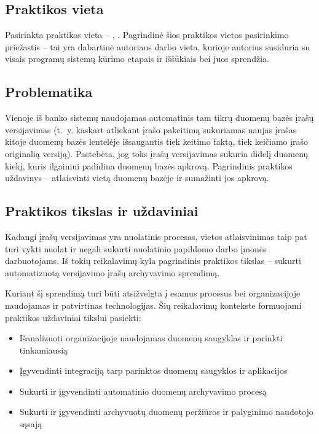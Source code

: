 
\subsection*{Praktikos vieta}
Pasirinkta praktikos vieta -- \SEB, \PDT. Pagrindinė šios praktikos vietos pasirinkimo priežastis -- tai yra dabartinė autoriaus darbo vieta, kurioje autorius susiduria su visais programų sistemų kūrimo etapais ir iššūkiais bei juos sprendžia. 

\subsection*{Problematika}
Vienoje iš banko sistemų naudojamas automatinis tam tikrų duomenų bazės įrašų versijavimas (t.~y. kaskart atliekant įrašo pakeitimą sukuriamas naujas įrašas kitoje duomenų bazės lentelėje išsaugantis tiek keitimo faktą, tiek keičiamo įrašo originalią versiją). Pastebėta, jog toks įrašų versijavimas sukuria didelį duomenų kiekį, kuris ilgainiui padidina duomenų bazės apkrovą. Pagrindinis praktikos uždavinys -- atlaisvinti vietą duomenų bazėje ir sumažinti jos apkrovą.

\subsection*{Praktikos tikslas ir uždaviniai}
Kadangi įrašų versijavimas yra nuolatinis procesas, vietos atlaisvinimas taip pat turi vykti nuolat ir negali sukurti nuolatinio papildomo darbo įmonės darbuotojams. Iš tokių reikalavimų kyla pagrindinis praktikos tikslas -- sukurti automatizuotą versijavimo įrašų archyvavimo sprendimą.

Kuriant šį sprendimą turi būti atsižvelgta į esamus procesus bei organizacijoje naudojamas ir patvirtinas technologijas. Šių reikalavimų kontekste formuojami praktikos uždaviniai tikslui pasiekti:
\begin{itemize}
    \item Išanalizuoti organizacijoje naudojamas duomenų saugyklas ir parinkti tinkamiausią
    \item Įgyvendinti integraciją tarp parinktos duomenų saugyklos ir aplikacijos
    \item Sukurti ir įgyvendinti automatinio duomenų archyvavimo procesą
    \item Sukurti ir įgyvendinti archyvuotų duomenų peržiūros ir palyginimo naudotojo sąsają
\end{itemize}   

